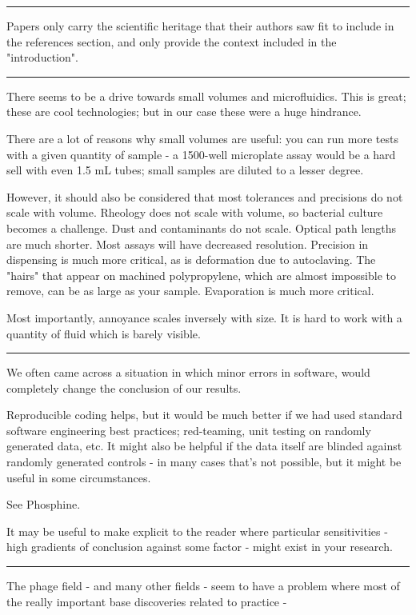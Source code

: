 \documentclass[paper.tex]{subfiles}
\begin{document}
\rule{\linewidth}{0.2pt}

Papers only carry the scientific heritage that their authors saw fit to include in the references section, and only provide the context included in the "introduction". 

\rule{\linewidth}{0.2pt}

There seems to be a drive towards small volumes and microfluidics. This is great; these are cool technologies; but in our case these were a huge hindrance.

There are a lot of reasons why small volumes are useful: you can run more tests with a given quantity of sample - a 1500-well microplate assay would be a hard sell with even 1.5 mL tubes; small samples are diluted to a lesser degree. 

However, it should also be considered that most tolerances and precisions do not scale with volume. 
Rheology does not scale with volume, so bacterial culture becomes a challenge. Dust and contaminants do not scale. Optical path lengths are much shorter. Most assays will have decreased resolution. Precision in dispensing is much more critical, as is deformation due to autoclaving. The "hairs" that appear on machined polypropylene, which are almost impossible to remove, can be as large as your sample. Evaporation is much more critical.

Most importantly, annoyance scales inversely with size. It is hard to work with a quantity of fluid which is barely visible.

\rule{\linewidth}{0.2pt}

We often came across a situation in which minor errors in software,  would completely change the conclusion of our results.

Reproducible coding helps, but it would be much better if we had used standard software engineering best practices; red-teaming, unit testing on randomly generated data, etc. It might also be helpful if the data itself are blinded against randomly generated controls - in many cases that's not possible, but it might be useful in some circumstances.

See Phosphine.

It may be useful to make explicit to the reader where particular sensitivities - high gradients of conclusion against some factor - might exist in your research.

\rule{\linewidth}{0.2pt}

The phage field - and many other fields - seem to have a problem where most of the really important base discoveries related to practice - 
\end{document}
